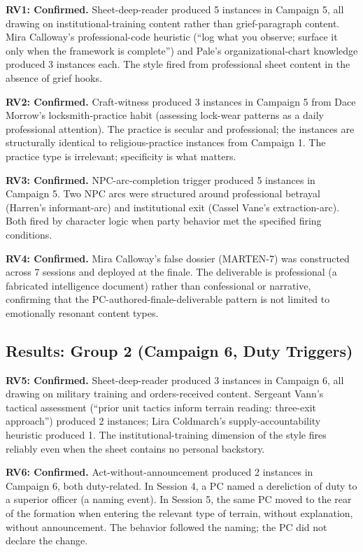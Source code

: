 \textbf{RV1: Confirmed.} Sheet-deep-reader produced 5 instances in Campaign 5, all
drawing on institutional-training content rather than grief-paragraph content. Mira
Calloway's professional-code heuristic (``log what you observe; surface it only when
the framework is complete'') and Pale's organizational-chart knowledge produced
3 instances each. The style fired from professional sheet content in the absence of
grief hooks.

\textbf{RV2: Confirmed.} Craft-witness produced 3 instances in Campaign 5 from
Dace Morrow's locksmith-practice habit (assessing lock-wear patterns as a daily
professional attention). The practice is secular and professional; the instances are
structurally identical to religious-practice instances from Campaign 1. The practice
type is irrelevant; specificity is what matters.

\textbf{RV3: Confirmed.} NPC-arc-completion trigger produced 5 instances in Campaign 5.
Two NPC arcs were structured around professional betrayal (Harren's informant-arc)
and institutional exit (Cassel Vane's extraction-arc). Both fired by character logic
when party behavior met the specified firing conditions.

\textbf{RV4: Confirmed.} Mira Calloway's false dossier (MARTEN-7) was constructed
across 7 sessions and deployed at the finale. The deliverable is professional (a
fabricated intelligence document) rather than confessional or narrative, confirming
that the PC-authored-finale-deliverable pattern is not limited to emotionally resonant
content types.

\subsection{Results: Group 2 (Campaign 6, Duty Triggers)}

\textbf{RV5: Confirmed.} Sheet-deep-reader produced 3 instances in Campaign 6, all
drawing on military training and orders-received content. Sergeant Vann's tactical
assessment (``prior unit tactics inform terrain reading: three-exit approach'')
produced 2 instances; Lira Coldmarch's supply-accountability heuristic produced 1.
The institutional-training dimension of the style fires reliably even when the sheet
contains no personal backstory.

\textbf{RV6: Confirmed.} Act-without-announcement produced 2 instances in Campaign 6,
both duty-related. In Session 4, a PC named a dereliction of duty to a superior officer
(a naming event). In Session 5, the same PC moved to the rear of the formation when
entering the relevant type of terrain, without explanation, without announcement.
The behavior followed the naming; the PC did not declare the change.

